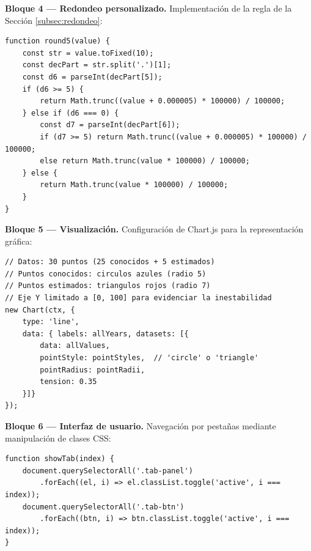 \documentclass[12pt, letterpaper]{article}
\begin{document}
\textbf{Bloque 4 --- Redondeo personalizado.} Implementación de la regla de la Sección \ref{subsec:redondeo}:

\begin{lstlisting}[style=pseudocode, caption={Redondeo a 5 decimales}, label={lst:redondeo}]
function round5(value) {
    const str = value.toFixed(10);
    const decPart = str.split('.')[1];
    const d6 = parseInt(decPart[5]);
    if (d6 >= 5) {
        return Math.trunc((value + 0.000005) * 100000) / 100000;
    } else if (d6 === 0) {
        const d7 = parseInt(decPart[6]);
        if (d7 >= 5) return Math.trunc((value + 0.000005) * 100000) / 100000;
        else return Math.trunc(value * 100000) / 100000;
    } else {
        return Math.trunc(value * 100000) / 100000;
    }
}
\end{lstlisting}

\textbf{Bloque 5 --- Visualización.} Configuración de Chart.js para la representación gráfica:

\begin{lstlisting}[style=pseudocode, caption={Configuración de la gráfica}, label={lst:chart}]
// Datos: 30 puntos (25 conocidos + 5 estimados)
// Puntos conocidos: circulos azules (radio 5)
// Puntos estimados: triangulos rojos (radio 7)
// Eje Y limitado a [0, 100] para evidenciar la inestabilidad
new Chart(ctx, {
    type: 'line',
    data: { labels: allYears, datasets: [{
        data: allValues,
        pointStyle: pointStyles,  // 'circle' o 'triangle'
        pointRadius: pointRadii,
        tension: 0.35
    }]}
});
\end{lstlisting}

\textbf{Bloque 6 --- Interfaz de usuario.} Navegación por pestañas mediante manipulación de clases CSS:

\begin{lstlisting}[style=pseudocode, caption={Lógica de navegación por pestañas}, label={lst:ui}]
function showTab(index) {
    document.querySelectorAll('.tab-panel')
        .forEach((el, i) => el.classList.toggle('active', i === index));
    document.querySelectorAll('.tab-btn')
        .forEach((btn, i) => btn.classList.toggle('active', i === index));
}
\end{lstlisting}
\end{document}
